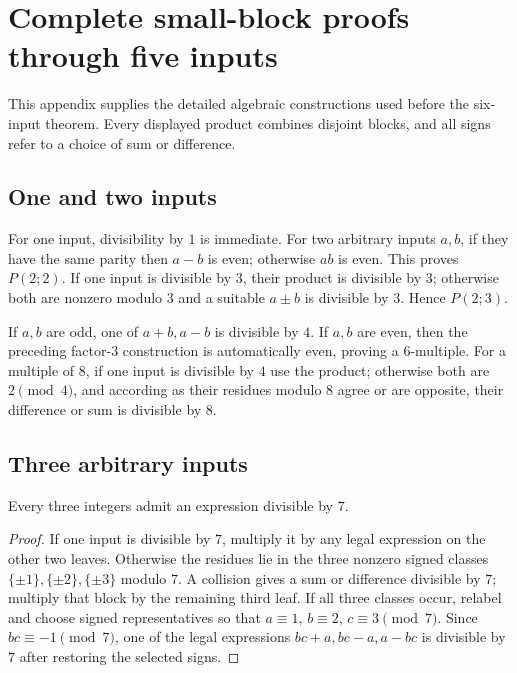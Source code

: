 \section{Complete small-block proofs through five inputs}\label{app:small}

This appendix supplies the detailed algebraic constructions used before the
six-input theorem.  Every displayed product combines disjoint blocks, and
all signs refer to a choice of sum or difference.

\subsection{One and two inputs}

For one input, divisibility by $1$ is immediate.  For two arbitrary inputs
$a,b$, if they have the same parity then $a-b$ is even; otherwise $ab$ is
even.  This proves $P(2;2)$.  If one input is divisible by $3$, their product
is divisible by $3$; otherwise both are nonzero modulo $3$ and a suitable
$a\pm b$ is divisible by $3$.  Hence $P(2;3)$.

If $a,b$ are odd, one of $a+b,a-b$ is divisible by $4$.  If $a,b$ are even,
then the preceding factor-$3$ construction is automatically even, proving a
$6$-multiple.  For a multiple of $8$, if one input is divisible by $4$ use
the product; otherwise both are $2\pmod4$, and according as their residues
modulo $8$ agree or are opposite, their difference or sum is divisible by
$8$.

\subsection{Three arbitrary inputs}

\begin{theorem}\label{app:three7}
Every three integers admit an expression divisible by $7$.
\end{theorem}
\begin{proof}
If one input is divisible by $7$, multiply it by any legal expression on the
other two leaves.  Otherwise the residues lie in the three nonzero signed
classes $\{\pm1\},\{\pm2\},\{\pm3\}$ modulo $7$.  A collision gives a sum
or difference divisible by $7$; multiply that block by the remaining third
leaf.  If all three classes occur, relabel and choose signed representatives
so that $a\equiv1$, $b\equiv2$, $c\equiv3\pmod7$.  Since
$bc\equiv-1\pmod7$, one of the legal expressions $bc+a,bc-a,a-bc$ is
divisible by $7$ after restoring the selected signs.
\end{proof}


